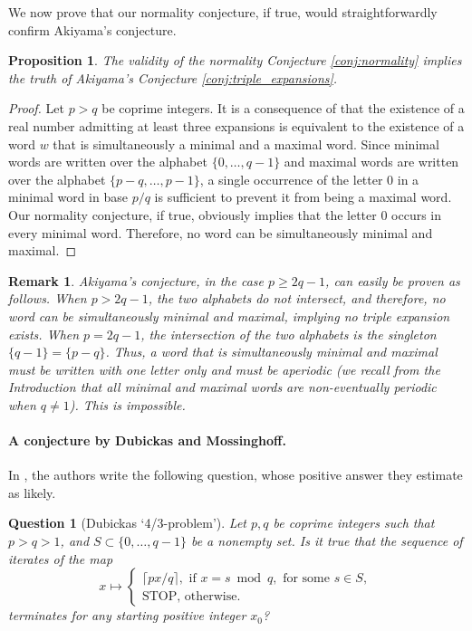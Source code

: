 \documentclass{template_arxiv}
\newtheorem{proposition}[theorem]{Proposition}
\newtheorem{question}[theorem]{Question}
\newtheorem{remark}[theorem]{Remark}
\numberwithin{equation}{section}
\begin{document}
We now prove that our normality conjecture, if true, would straightforwardly confirm Akiyama's conjecture.


\begin{proposition}\label{prop:impliesAkiyama}
	The validity of the normality Conjecture \ref{conj:normality} implies the truth of Akiyama's Conjecture \ref{conj:triple_expansions}.
\end{proposition}



\begin{proof}
	Let $p>q$ be coprime integers. It is a consequence of \cite[Section 5]{AFS08} that the existence of a real number admitting at least three expansions is equivalent to the existence of a word $w$ that is simultaneously a minimal and a maximal word.
	Since minimal words are written over the alphabet $\{0,\dots,q-1\}$
	and maximal words are written over the alphabet $\{p-q,\dots,p-1\}$, a single occurrence of the letter $0$ in a minimal word in base  $p/q$ is sufficient to prevent it from being a maximal word. Our normality conjecture, if true, obviously implies that the letter $0$ occurs in every minimal word. Therefore, no word can be simultaneously minimal and maximal.
\end{proof}

\begin{remark}\label{rk:notripleexpansion}
	Akiyama's conjecture, in the case $p\geq2q-1$, can easily be proven as follows. When $p>2q-1$, the two alphabets do not intersect, and therefore, no word can be simultaneously minimal and maximal, implying no triple expansion exists. When $p=2q-1$, the intersection of the two alphabets is the singleton $\{q-1\}=\{p-q\}$. Thus, a word that is simultaneously minimal and maximal must be written with one letter only and must be aperiodic (we recall from the Introduction that all minimal and maximal words are non-eventually periodic when $q\neq 1$). This is impossible.
\end{remark}

\paragraph{A conjecture by Dubickas and Mossinghoff.} In \cite[Section~1]{DM09}, the authors write the following question, whose positive answer they estimate as likely.

\begin{question}[Dubickas `4/3-problem']\label{question:DM09}
	Let $p,q$ be coprime integers such that $p>q>1$, and $S\subset\{0,\dots,q-1\}$ be a nonempty set. Is it true that the sequence of iterates of the map
	\[x \mapsto \begin{cases}
	\lceil px/q \rceil, \text{ if } x = s \bmod q, \text{ for some } s\in S,  \\ \text{STOP, otherwise.}
	\end{cases}
	\]
	terminates for any starting positive integer $x_0$?
\end{question}
\end{document}
